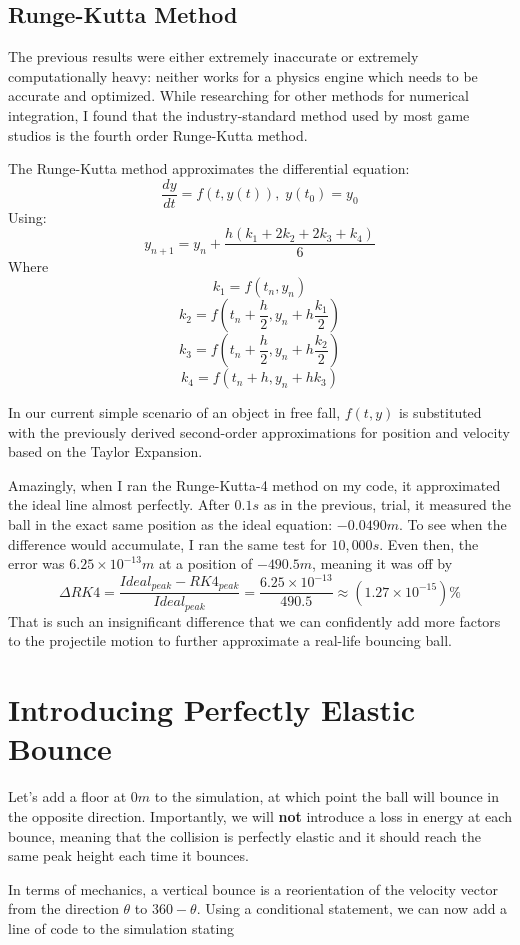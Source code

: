 \documentclass[12pt]{article}
\begin{document}
\subsection{Runge-Kutta Method}

The previous results were either extremely inaccurate or extremely computationally heavy: neither works for a physics engine which needs to be accurate and optimized. While researching for other methods for numerical integration, I found that the industry-standard method used by most game studios is the fourth order Runge-Kutta method. 

The Runge-Kutta method approximates the differential equation:
$$\frac{dy}{dt} = f(t,y(t)), \; y(t_0) = y_0$$
Using:
$$y_{n+1} = y_n + \frac{h(k_1+2k_2+2k_3+k_4)}{6}$$
Where
$$k_1 = f(t_n,y_n)$$
$$k_2 = f(t_n+\frac{h}{2},y_n + h\frac{k_1}{2})$$
$$k_3 = f(t_n+\frac{h}{2},y_n + h\frac{k_2}{2})$$
$$k_4 = f(t_n+h,y_n+hk_3)$$

In our current simple scenario of an object in free fall, $f(t,y)$ is substituted with the previously derived second-order approximations for position and velocity based on the Taylor Expansion. 

Amazingly, when I ran the Runge-Kutta-4 method on my code, it approximated the ideal line almost perfectly. After $0.1s$ as in the previous, trial, it measured the ball in the exact same position as the ideal equation: $-0.0490m$. To see when the difference would accumulate, I ran the same test for $10,000s$. Even then, the error was $6.25\times 10^{-13}m$ at a position of $-490.5m$, meaning it was off by
$$\Delta RK4 = \frac{Ideal_{peak} - RK4_{peak}}{Ideal_{peak}} = \frac{6.25\times 10^{-13}}{490.5} \approx (1.27 \times 10^{-15})\%$$ 
That is such an insignificant difference that we can confidently add more factors to the projectile motion to further approximate a real-life bouncing ball.

\section{Introducing Perfectly Elastic Bounce}

Let's add a floor at $0m$ to the simulation, at which point the ball will bounce in the opposite direction. Importantly, we will \textbf{not} introduce a loss in energy at each bounce, meaning that the collision is perfectly elastic and it should reach the same peak height each time it bounces. 

In terms of mechanics, a vertical bounce is a reorientation of the velocity vector from the direction $\theta$ to $360 - \theta$. Using a conditional statement, we can now add a line of code to the simulation stating 
\end{document}
